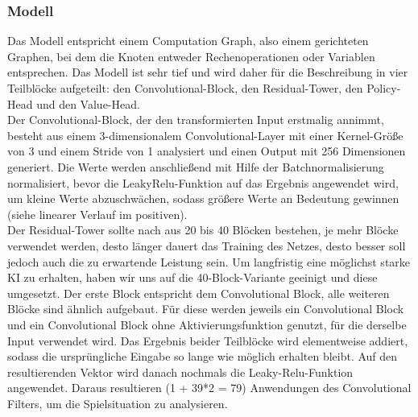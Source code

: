 \documentclass[12pt,a4paper]{article}
\begin{document}
\subsubsection{Modell}
Das Modell entspricht einem Computation Graph, also einem gerichteten Graphen, bei dem die Knoten entweder Rechenoperationen oder Variablen entsprechen. Das Modell ist sehr tief und wird daher für die Beschreibung in vier Teilblöcke aufgeteilt: den Convolutional-Block, den Residual-Tower, den Policy-Head und den Value-Head. \\
Der Convolutional-Block, der den transformierten Input erstmalig annimmt, besteht aus einem 3-dimensionalem Convolutional-Layer mit einer Kernel-Größe von 3 und einem Stride von 1 analysiert und einen Output mit 256 Dimensionen generiert. Die Werte werden anschließend mit Hilfe der Batchnormalisierung normalisiert, bevor die LeakyRelu-Funktion auf das Ergebnis angewendet wird, um kleine Werte abzuschwächen, sodass größere Werte an Bedeutung gewinnen (siehe linearer Verlauf im positiven). \\
Der Residual-Tower sollte nach \cite{Silver2017} aus 20 bis 40 Blöcken bestehen, je mehr Blöcke verwendet werden, desto länger dauert das Training des Netzes, desto besser soll jedoch auch die zu erwartende Leistung sein. Um langfristig eine möglichst starke KI zu erhalten, haben wir uns auf die 40-Block-Variante geeinigt und diese umgesetzt. Der erste Block entspricht dem Convolutional Block, alle weiteren Blöcke sind ähnlich aufgebaut. Für diese werden jeweils ein Convolutional Block und ein Convolutional Block ohne Aktivierungsfunktion genutzt, für die derselbe Input verwendet wird. Das Ergebnis beider Teilblöcke wird elementweise addiert, sodass die ursprüngliche Eingabe so lange wie möglich erhalten bleibt. Auf den resultierenden Vektor wird danach nochmals die Leaky-Relu-Funktion angewendet. Daraus resultieren (1 + 39*2 = 79) Anwendungen des Convolutional Filters, um die Spielsituation zu analysieren. \\
\end{document}
